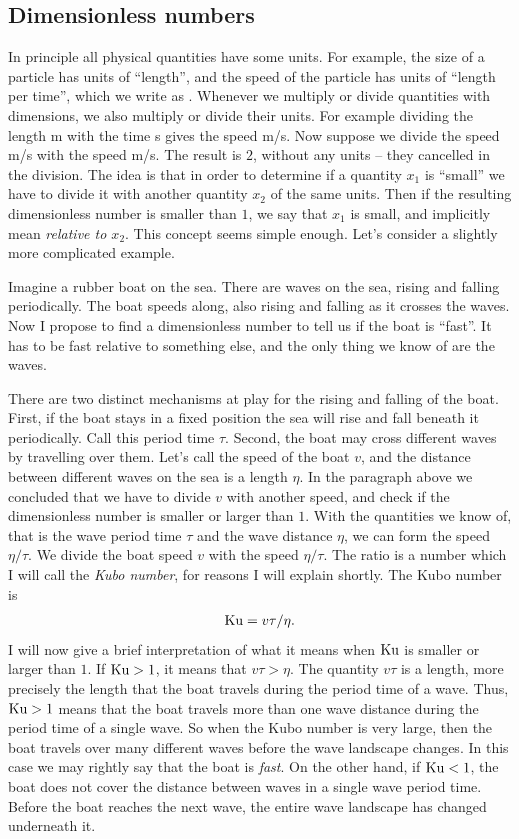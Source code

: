 \documentclass[thesis.tex]{subfiles}
\begin{document}
\subsection*{Dimensionless numbers}

In principle all physical quantities have some units. For example, the size of a particle has units of ``length'', and the speed of the particle has units of ``length per time'', which we write as . Whenever we multiply or divide quantities with dimensions, we also multiply or divide their units. For example dividing the length \unit[20]{m} with the time \unit[5]{s} gives the speed \unit[4]{m/s}. Now suppose we divide the speed \unit[4]{m/s} with the speed \unit[2]{m/s}. The result is $2$, without any units -- they cancelled in the division. The idea is that in order to determine if a quantity $x_1$ is ``small'' we have to divide it with another quantity $x_2$ of the same units. Then if the resulting dimensionless number is smaller than $1$, we say that $x_1$ is small, and implicitly mean \emph{relative to $x_2$}.  This concept seems simple enough. Let's consider a slightly more complicated example.

Imagine a rubber boat on the sea. There are waves on the sea, rising and falling periodically.  The boat speeds along, also rising and falling as it crosses the waves. Now I propose to find a dimensionless number to tell us if the boat is ``fast''. It has to be fast relative to something else, and the only thing we know of are the waves. 

There are two distinct mechanisms at play for the rising and falling of the boat. First, if the boat stays in a fixed position the sea will rise and fall beneath it periodically. Call this period time $\tau$. Second, the boat may cross different waves by travelling over them. Let's call the speed of the boat $v$, and the distance between different waves on the sea is a length $\eta$. In the paragraph above we concluded that we have to divide $v$ with another speed, and check if the dimensionless number is smaller or larger than $1$. With the quantities we know of, that is the wave period time $\tau$ and the wave distance $\eta$, we can form the speed $\eta/\tau$. We divide the boat speed $v$ with the speed $\eta/\tau$. The ratio is a number which I will call the \emph{Kubo number}, for reasons I will explain shortly. The Kubo number is
\begin{align*}
\mbox{Ku} = v\tau/\eta.
\end{align*}
I will now give a brief interpretation of what it means when $\mbox{Ku}$ is smaller or larger than $1$. If $\mbox{Ku} > 1$, it means that $v\tau > \eta$. The quantity $v\tau$ is a length, more precisely the length that the boat travels during the period time of a wave. Thus, $\mbox{Ku} > 1$ means that the boat travels more than one wave distance during the period time of a single wave. So when the Kubo number is very large, then the boat travels over many different waves before the wave landscape changes. In this case we may rightly say that the boat is \emph{fast}. On the other hand, if $\mbox{Ku}<1$, the boat does not cover the distance between waves in a single wave period time. Before the boat reaches the next wave, the entire wave landscape has changed underneath it.
\end{document}
